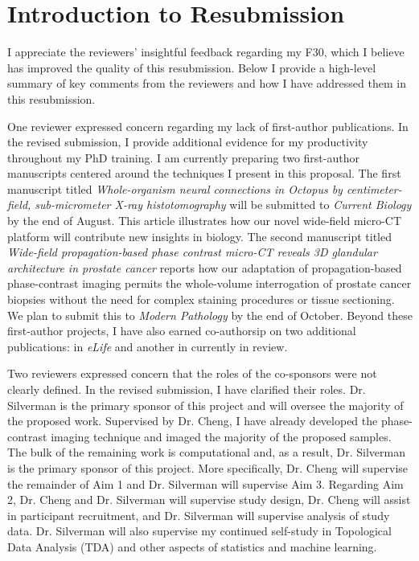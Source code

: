 \documentclass{nihgrant}
\begin{document}
\part*{Introduction to Resubmission}

I appreciate the reviewers' insightful feedback regarding my F30, which I believe has improved the quality of this resubmission. Below I provide a high-level summary of key comments from the reviewers and how I have addressed them in this resubmission.

One reviewer expressed concern regarding my lack of first-author publications. In the revised submission, I provide additional evidence for my productivity throughout my PhD training. I am currently preparing two first-author manuscripts centered around the techniques I present in this proposal. The first manuscript titled \textit{Whole-organism neural connections in Octopus by centimeter-field, sub-micrometer X-ray histotomography} will be submitted to \textit{Current Biology} by the end of August. This article illustrates how our novel wide-field micro-CT platform will contribute new insights in biology. The second manuscript titled \textit{Wide-field propagation-based phase contrast micro-CT reveals 3D glandular architecture in prostate cancer} reports how our adaptation of propagation-based phase-contrast imaging permits the whole-volume interrogation of prostate cancer biopsies without the need for complex staining procedures or tissue sectioning. We plan to submit this to \textit{Modern Pathology} by the end of October. Beyond these first-author projects, I have also earned co-authorsip on two additional publications: in \textit{eLife} and another in currently in review.

Two reviewers expressed concern that the roles of the co-sponsors were not clearly defined. In the revised submission, I have clarified their roles. Dr. Silverman is the primary sponsor of this project and will oversee the majority of the proposed work. Supervised by Dr. Cheng, I have already developed the phase-contrast imaging technique and imaged the majority of the proposed samples. The bulk of the remaining work is computational and, as a result, Dr. Silverman is the primary sponsor of this project. More specifically, Dr. Cheng will supervise the remainder of Aim 1 and Dr. Silverman will supervise Aim 3. Regarding Aim 2, Dr. Cheng and Dr. Silverman will supervise study design, Dr. Cheng will assist in participant recruitment, and Dr. Silverman will supervise analysis of study data. Dr. Silverman will also supervise my continued self-study in Topological Data Analysis (TDA) and other aspects of statistics and machine learning.
\end{document}
